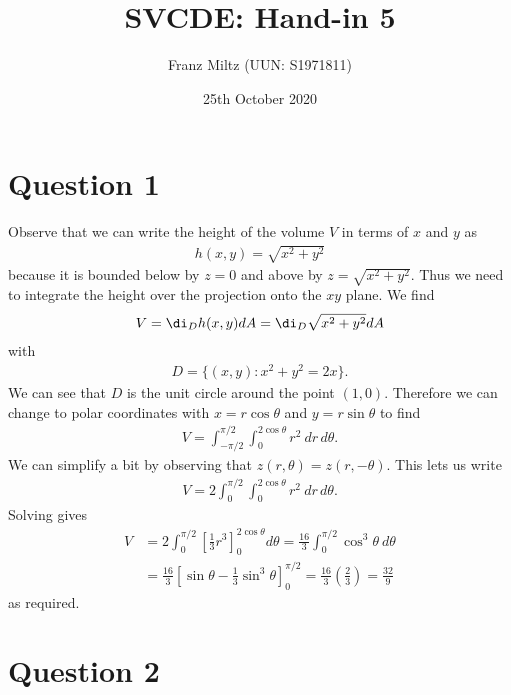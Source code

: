 \documentclass{article}
\begin{document}
\title{SVCDE: Hand-in 5}
\author{Franz Miltz (UUN: S1971811)}
\date{25th October 2020}
\maketitle


\section*{Question 1}


Observe that we can write the height of the volume $V$ in terms of $x$ and $y$ as
\begin{align*}
  h(x,y) = \sqrt{x^2 + y^2}
\end{align*}
because it is bounded below by $z=0$ and above by $z=\sqrt{x^2 + y^2}$.
Thus we need to integrate the height over the projection onto the $xy$ plane. We find
\begin{align*}
  V = \di_D h(x,y)dA = \di_D \sqrt{x^2+y^2}dA
\end{align*}
with
\begin{align*}
  D = \{(x,y) : x^2 + y^2 = 2x\}.
\end{align*}
We can see that $D$ is the unit circle around the point $(1,0)$. Therefore we can
change to polar coordinates with $x=r\cos\theta$ and $y=r\sin\theta$ to find
\begin{align*}
  V = \int_{-\pi/2}^{\pi/2}\int_0^{2\cos\theta} r^2\: dr\,d\theta.
\end{align*}
We can simplify a bit by observing that $z(r,\theta)=z(r,-\theta)$. This lets us write
\begin{align*}
  V = 2\int_{0}^{\pi/2}\int_0^{2\cos \theta} r^2\: dr\,d\theta.
\end{align*}
Solving gives
\begin{align*}
  V & = 2\int_0^{\pi/2}\left[\frac{1}{3}r^3\right]_0^{2\cos \theta}d\theta
  =\frac{16}{3}\int_0^{\pi/2}\cos^3 \theta\:d\theta                              \\
    & =\frac{16}{3}\left[\sin \theta - \frac{1}{3}\sin^3 \theta\right]_0^{\pi/2}
  =\frac{16}{3}\left(\frac{2}{3}\right) = \frac{32}{9}
\end{align*}
as required.


\section*{Question 2}
\end{document}
